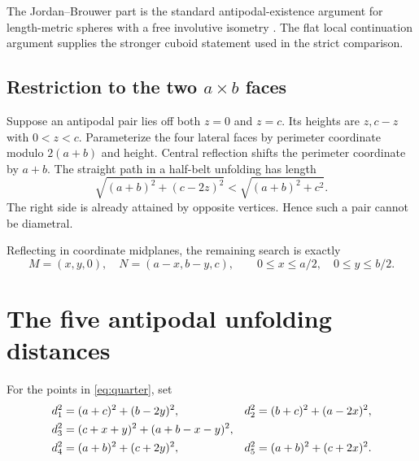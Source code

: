 \documentclass[11pt]{article}
\theoremstyle{definition}
\begin{document}
The Jordan--Brouwer part is the standard antipodal-existence argument
for length-metric spheres with a free involutive isometry
\cite{Nikonorov2018}. The flat local continuation argument supplies the
stronger cuboid statement used in the strict comparison.

\subsection{Restriction to the two \texorpdfstring{\(a\times b\)}{a x b} faces}

Suppose an antipodal pair lies off both \(z=0\) and \(z=c\).
Its heights are \(z,c-z\) with \(0<z<c\). Parameterize the four
lateral faces by perimeter coordinate modulo \(2(a+b)\) and height.
Central reflection shifts the perimeter coordinate by \(a+b\).
The straight path in a half-belt unfolding has length
\[
\sqrt{(a+b)^2+(c-2z)^2}<\sqrt{(a+b)^2+c^2}.
\]
The right side is already attained by opposite vertices. Hence such
a pair cannot be diametral.

Reflecting in coordinate midplanes, the remaining search is exactly
\begin{equation}\label{eq:quarter}
M=(x,y,0),\quad N=(a-x,b-y,c),\qquad
0\le x\le a/2,\quad 0\le y\le b/2.
\end{equation}

\section{The five antipodal unfolding distances}
\label{sec:five}

For the points in \eqref{eq:quarter}, set
\begin{align}
d_1^2&=(a+c)^2+(b-2y)^2,&
d_2^2&=(b+c)^2+(a-2x)^2,\notag\\
d_3^2&=(c+x+y)^2+(a+b-x-y)^2,\label{eq:five}\\
d_4^2&=(a+b)^2+(c+2y)^2,&
d_5^2&=(a+b)^2+(c+2x)^2.\notag
\end{align}
\end{document}
